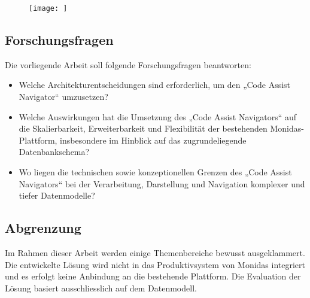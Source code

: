 \begin{figure}[H]
  \centering
  \texttt{[image: ]}
  \caption{}
  \label{fig:res}
\end{figure}

\newpage

\subsection{Forschungsfragen}

Die vorliegende Arbeit soll folgende Forschungsfragen beantworten:

\begin{itemize}
    \item Welche Architekturentscheidungen sind erforderlich, um den „Code Assist Navigator“ umzusetzen? 
    \item Welche Auswirkungen hat die Umsetzung des „Code Assist Navigators“ auf die Skalierbarkeit, Erweiterbarkeit und Flexibilität der bestehenden Monidas-Plattform, insbesondere im Hinblick auf das zugrundeliegende Datenbankschema? 
    \item Wo liegen die technischen sowie konzeptionellen Grenzen des „Code Assist Navigators“ bei der Verarbeitung, Darstellung und Navigation komplexer und tiefer Datenmodelle?
\end{itemize}

\subsection{Abgrenzung}


Im Rahmen dieser Arbeit werden einige Themenbereiche bewusst ausgeklammert. Die entwickelte Lösung wird nicht in das Produktivsystem von Monidas integriert und es erfolgt keine Anbindung an die bestehende Plattform. Die Evaluation der Lösung basiert ausschliesslich auf dem Datenmodell.

